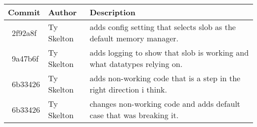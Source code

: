 \begin{tabular}{l l l}\textbf{Commit} & \textbf{Author} & \textbf{Description}\\\hline
\ 2f92a8f & Ty Skelton & adds config setting that selects slob as the default memory manager.\\\hline
\ 9a47b6f & Ty Skelton & adds logging to show that slob is working and what datatypes relying on.\\\hline
\ 6b33426 & Ty Skelton & adds non-working code that is a step in the right direction i think.\\\hline
\ 6b33426 & Ty Skelton & changes non-working code and adds default case that was breaking it.\\\hline
\end{tabular}
